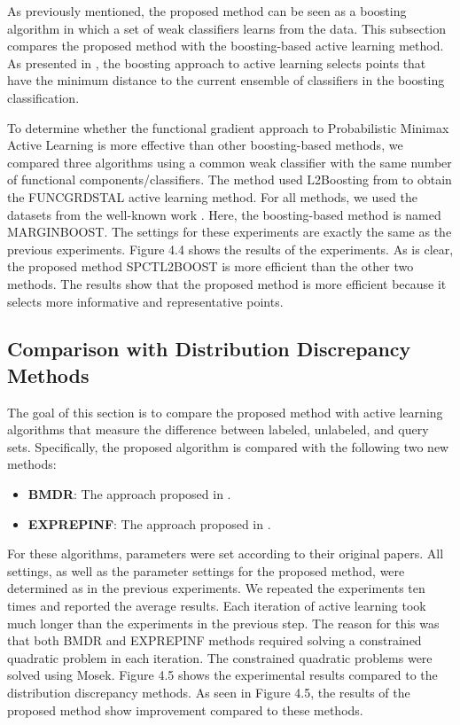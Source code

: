 \documentclass[12pt]{article}
\begin{document}
	As previously mentioned, the proposed method can be seen as a boosting algorithm in which a set of weak classifiers learns from the data. This subsection compares the proposed method with the boosting-based active learning method. As presented in \cite{schapire1997boosting}, the boosting approach to active learning selects points that have the minimum distance to the current ensemble of classifiers in the boosting classification.
	
	To determine whether the functional gradient approach to Probabilistic Minimax Active Learning is more effective than other boosting-based methods, we compared three algorithms using a common weak classifier with the same number of functional components/classifiers. The method used L2Boosting from \cite{buhlmann2003boosting} to obtain the FUNCGRDSTAL active learning method. For all methods, we used the datasets from the well-known work \cite{chang2011libsvm}. Here, the boosting-based method is named MARGINBOOST. The settings for these experiments are exactly the same as the previous experiments. Figure 4.4 shows the results of the experiments. As is clear, the proposed method SPCTL2BOOST is more efficient than the other two methods. The results show that the proposed method is more efficient because it selects more informative and representative points.
	
	\subsection{Comparison with Distribution Discrepancy Methods}
	The goal of this section is to compare the proposed method with active learning algorithms that measure the difference between labeled, unlabeled, and query sets. Specifically, the proposed algorithm is compared with the following two new methods:
	\begin{itemize}
		\item \textbf{BMDR}: The approach proposed in \cite{wang2016active}.
		\item \textbf{EXPREPINF}: The approach proposed in \cite{bissoto2015active}.
	\end{itemize}
	For these algorithms, parameters were set according to their original papers. All settings, as well as the parameter settings for the proposed method, were determined as in the previous experiments. We repeated the experiments ten times and reported the average results. Each iteration of active learning took much longer than the experiments in the previous step. The reason for this was that both BMDR and EXPREPINF methods required solving a constrained quadratic problem in each iteration. The constrained quadratic problems were solved using Mosek. Figure 4.5 shows the experimental results compared to the distribution discrepancy methods. As seen in Figure 4.5, the results of the proposed method show improvement compared to these methods.
	
\end{document}
